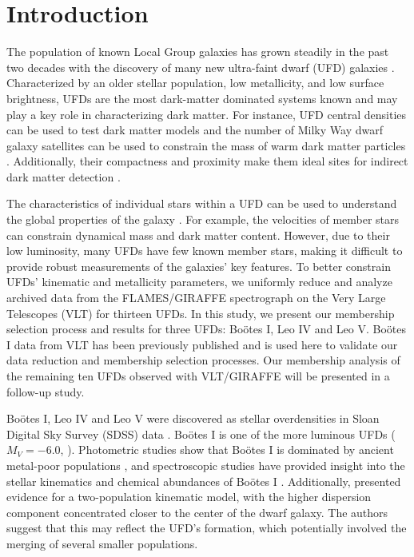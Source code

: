 \documentclass[twocolumn]{aastex63}
\begin{document}
\section{Introduction}
\label{sec:introduction}
The population of known Local Group galaxies has grown steadily in the past two decades with the discovery of many new ultra-faint dwarf (UFD) galaxies \citep[e.g.,][]{bel2006, bel2007,bel2008,bec2015,kop2015b,mau2020}. Characterized by an older stellar population, low metallicity, and low surface brightness, UFDs are the most dark-matter dominated systems known \citep{sim2007, gil2007, Simon2019ARA&A..57..375S} and may play a key role in characterizing dark matter. For instance, UFD central densities can be used to test dark matter models \citep[e.g.,][]{cal2016} and the number of Milky Way dwarf galaxy satellites can be used to constrain the mass of warm dark matter particles \citep{ken2014, Nadler2020arXiv200800022N}. Additionally, their compactness and proximity make them ideal sites for indirect dark matter detection \citep[e.g.,][]{ahn2018, Hoof2020JCAP...02..012H}.

The characteristics of individual stars within a UFD can be used to understand the global properties of the galaxy \citep[e.g.,][]{sim2007}. For example, the velocities of member stars can constrain dynamical mass and dark matter content. However, due to their low luminosity, many UFDs have few known member stars, making it difficult to provide robust measurements of the galaxies' key features. To better constrain UFDs' kinematic and metallicity parameters, we uniformly reduce and analyze archived data from the FLAMES/GIRAFFE spectrograph on the Very Large Telescopes (VLT) for thirteen UFDs. In this study, we present our membership selection process and results for three UFDs: Bo{\"o}tes I, Leo IV and Leo V. Bo{\"o}tes I data from VLT has been previously published \citep{kop2011} and is used here to validate our data reduction and membership selection processes. Our membership analysis of the remaining ten UFDs observed with VLT/GIRAFFE will be presented in a follow-up study.
 


Bo{\"o}tes I, Leo IV and Leo V were discovered as stellar overdensities in Sloan Digital Sky Survey (SDSS) data \citep{bel2006, bel2007, bel2008}. Bo{\"o}tes I is one of the more luminous UFDs ($M_V=-6.0$, \citealt{mun2018}). Photometric studies show that Bo{\"o}tes I is dominated by ancient metal-poor populations \citep{bro2014}, and spectroscopic studies have provided insight into the stellar kinematics and chemical abundances of Bo{\"o}tes I \citep{mun2006,Mar2007,wol2010,nor2010,kop2011,lai2011}. Additionally, \citet{kop2011} presented evidence for a two-population kinematic model, with the higher dispersion component concentrated closer to the center of the dwarf galaxy. The authors suggest that this may reflect the UFD's formation, which potentially involved the merging of several smaller populations.
\end{document}
